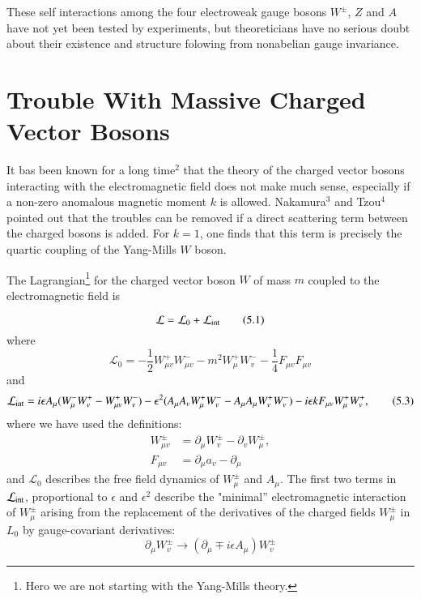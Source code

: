 These self interactions among the four electroweak gauge bosons $W^{\pm}$, $Z$ and $A$ have not yet
been tested by experiments, but theoreticians have no serious doubt about their existence and
structure folowing from nonabelian gauge invariance. 

\section{Trouble With Massive Charged Vector Bosons}

It bas been known for a long time$^{2}$ that the theory of the charged vector bosons interacting with
the electromagnetic field does not make much sense, especially if a non-zero anomalous magnetic
moment $k$ is allowed. Nakamura$^{3}$ and Tzou$^{4}$ pointed out that the troubles can be removed if a
direct scattering term between the charged bosons is added. For $k = 1$, one finds that this term is
precisely the quartic coupling of the Yang-Mills $W$ boson. 

The Lagrangian\footnote{Hero we are not starting with the Yang-Mills theory.} for the charged vector boson $W$ of mass $m$ coupled to the electromagnetic field is 

\begin{equation*}
\mathcal{L} = \mathcal{L}_{0} + \mathcal{L}_{\rm int}\tag{5.1}
\end{equation*}
where
\begin{equation*}
\mathcal{L}_{0} = -\frac{1}{2} W^{+}_{\mu v}W^{-}_{\mu v} - m^{2}W^{+}_{\mu}W^{-}_{v}-\frac{1}{4}F_{\mu v}F_{\mu v}\tag{5.2}
\end{equation*}
and
{\fontsize{8}{10}\selectfont\begin{equation*}
\mathcal{L}_{\rm int} = i \epsilon A_{\mu} (W^{-}_{\mu} W^{+}_{v}-W^{+}_{\mu v}W^{-}_{v})-\epsilon^{2}(A_{\mu} A_{v} W^{+}_{\mu} W^{-}_{v}- A_{\mu}A_{\mu}W^{+}_{v} W^{-}_{v})-i \epsilon k F_{\mu v} W^{+}_{\mu} W^{+}_{v},\tag{5.3}
\end{equation*}}
where we have used the definitions: 
\begin{align*}
W^{\pm}_{\mu v} &= \partial_{\mu} W^{\pm}_{v}-\partial_{v}W^{\pm}_{\mu},\\
F_{\mu v} &= \partial_{\mu}a_{v}-\partial_{\mu}
\end{align*}
and $\mathcal{L}_{0}$ describes the free field dynamics of $W^{\pm}_{\mu}$ and $A_{\mu}$. The first two terms in 
$\mathcal{L}_{\rm int}$, proportional to
$\epsilon$ and $\epsilon^{2}$ describe the "minimal” electromagnetic interaction of $W^{\pm}_{\mu}$ arising from the replacement of
the derivatives of the charged fields $W^{\pm}_{\mu}$ in $L_{0}$ by gauge-covariant derivatives: 
$$
\partial_{\mu} W^{\pm}_{v}\rightarrow (\partial_{\mu} \mp i \epsilon A_{\mu})W^{\pm}_{v}
$$

